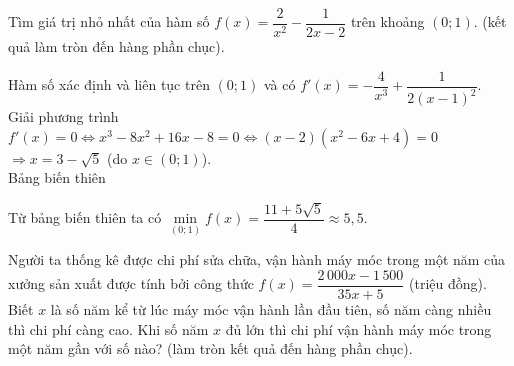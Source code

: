 \begin{ex}%
Tìm giá trị nhỏ nhất của hàm số $ f(x) = \dfrac{2}{x^2} - \dfrac{1}{2x-2}$ trên khoảng $(0;1)$. (kết quả làm tròn đến hàng phần chục).
\loigiai
{
Hàm số xác định và liên tục trên $(0;1)$ và có $f'(x)=-\dfrac{4}{{x^3}}+\dfrac{1}{2{{(x-1)}^2}}$.\\
Giải phương trình $f'(x)=0 \Leftrightarrow  {x^3}-8{x^2}+16x-8=0 \Leftrightarrow  (x-2)({x^2}-6x+4)=0$\\
$\Rightarrow  x=3-\sqrt {5}$ (do $ x\in (0;1)$).\\
Bảng biến thiên
\begin{center}
\end{center}
Từ bảng biến thiên ta có $\min\limits_{(0;1)}f(x)=\dfrac{11+5\sqrt {5}}{4}\approx 5{,}5$.
}
\end{ex}

\begin{ex}%
Người ta thống kê được chi phí sửa chữa, vận hành máy móc trong một năm của xưởng sản xuất được tính bởi công thức $f(x)=\dfrac{2\,000x-1\,500}{35x+5}$ (triệu đồng). Biết $x$ là số năm kể từ lúc máy móc vận hành lần đầu tiên, số năm càng nhiều thì chi phí càng cao. Khi số năm $x$ đủ lớn thì chi phí vận hành máy móc trong một năm gần với số nào? (làm tròn kết quả đến hàng phần chục).


\end{ex}

